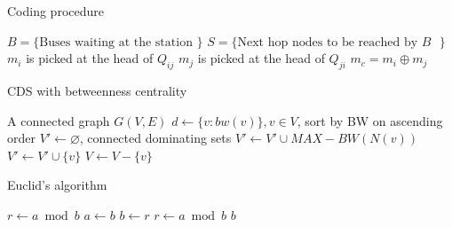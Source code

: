 \documentclass{article}
\let\emptyset\varnothing
\begin{document}
\begin{algorithm}
	\begin{algorithmic}%
		\caption{Coding procedure} \label{algorithm:encoding}
		\State $B=\{\text{Buses waiting at the station } \}$
		\State $S=\{\text{Next hop nodes to be reached by $B$ }\}$
				\If{$Q_{ij} \neq \emptyset \text{ and } Q_{ji} \neq \emptyset$}
					\State $m_i$ is picked at the head of $Q_{ij}$
					\State $m_j$ is picked at the head of $Q_{ji}$
					\State \Return $m_c = m_i \oplus m_j$
				\EndIf
			\EndFor
		\EndFor				
	\end{algorithmic}
\end{algorithm}

\begin{algorithm}
	\begin{algorithmic}[1]
		\caption{CDS with betweenness centrality} \label{algorithm: cds bw}
		\Require A connected graph $G(V, E)$
		\State $d \gets \{v : bw(v)\}, v \in V$, sort by BW on ascending order
		\State $V' \gets \emptyset$, connected dominating sets
        	    \State $V' \gets V' \cup MAX-BW(N(v))$		
        	\Else
        	    \State $V' \gets V' \cup \{v\}$
        	\EndIf
        	\State $V \gets V-\{v\}$
		\EndFor				
	\end{algorithmic}
\end{algorithm}

\begin{algorithm}
    \caption{Euclid’s algorithm}
    \label{euclid}
    \begin{algorithmic}[1] %
         				
            \State $r\gets a \bmod b$
             						
                \State $a \gets b$
                \State $b \gets r$
                \State $r \gets a \bmod b$
            \EndWhile\label{euclidendwhile}
            \State \Return $b$						
        \EndProcedure
    \end{algorithmic}
\end{algorithm}
\end{document}
